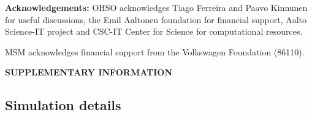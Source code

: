 \documentclass[pre,aps,floatfix,authordate1-4,twocolumn]{revtex4-1}
\begin{document}



{\bf Acknowledgements: }
OHSO acknowledges Tiago Ferreira and Paavo Kinnunen for useful discussions, the Emil Aaltonen foundation for financial support, Aalto Science-IT project and CSC-IT Center for Science for computational resources. 

MSM acknowledges  financial support from the Volkswagen Foundation (86110).



\newpage

\appendix
\begin{center}
{\bf SUPPLEMENTARY INFORMATION}
\end{center}
\subsection{Simulation details} 
\end{document}
